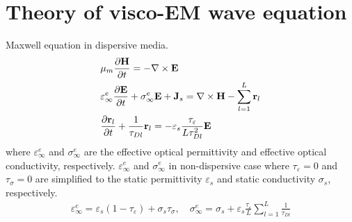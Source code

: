 \documentclass[pdftex,a4paper,parskip,listof=totoc,bibliography=totoc,onehalfspacing,12pt]{scrreprt}
\begin{document}
\section{Theory of visco-EM wave equation}
Maxwell equation in dispersive media.
\begin{equation}
\label{eqn:ViscoEM2}
\begin{aligned}
  &\mu_{m} \pdv{ \mathbf{H}}{t} = -\nabla \times \mathbf{E} \\
  &\varepsilon^e_\infty \pdv{ \mathbf{E}}{t} + \sigma_\infty^{e} \mathbf{E} + \mathbf{J}_s = \nabla \times \mathbf{H} - \sum_{l=1}^L \mathbf{r}_{l} \\
  &\pdv{\mathbf{r}_{l}}{t} + \frac{1}{\tau_{Dl}} \mathbf{r}_{l} = -\varepsilon_s \frac{\tau_{\varepsilon }}{L \tau_{Dl}^2} \mathbf{E} 
\end{aligned}
\end{equation}
where $\varepsilon^e_\infty$ and $\sigma_\infty^{e}$ are the effective optical permittivity and effective optical conductivity, respectively. $\varepsilon^e_\infty$ and $\sigma_\infty^{e}$ in non-dispersive case where $\tau_{\varepsilon } = 0$ and $\tau_{\sigma} = 0$ are simplified to the static permittivity $\varepsilon_s$ and static conductivity $\sigma_s$, respectively.
\begin{equation}
\label{eqn:ViscoParameter}
\begin{aligned}
  \varepsilon^e_\infty = \varepsilon_s \left( 1-\tau_{\varepsilon} \right) + \sigma_s \tau_{\sigma}, \quad
  \sigma_\infty^{e} = \sigma_s + \varepsilon_s \frac{\tau_{\varepsilon } }{L} \sum_{l=1}^L \frac{1}{\tau_{Dl}}
\end{aligned}
\end{equation} 
\end{document}
